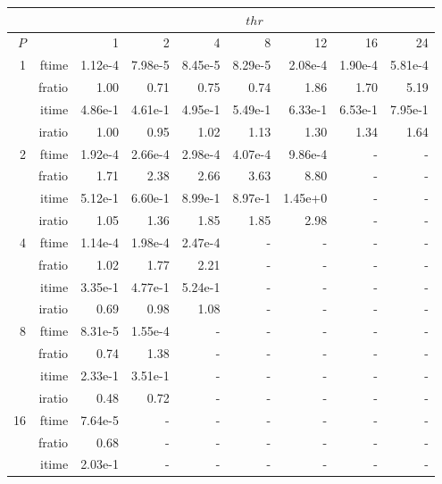 \documentclass[a4paper]{article}
\begin{document}
\begin{table}[htbp]
\begin{center}
\begin{small}
\begin{tabular}{|r|r|r|r|r|r|r|r|r|}
\hline 
     &  & \multicolumn{7}{c|}{$thr$} \\ \hline
    $P$  &  & 1           & 2    & 4    & 8    & 12   & 16    & 24  \\ \hline\hline
   1 &  ftime &   1.12e-4 &   7.98e-5 &   8.45e-5 &   8.29e-5 &   2.08e-4 &   1.90e-4 &   5.81e-4 \\
     &  fratio &   1.00 &   0.71 &   0.75 &   0.74 &   1.86 &   1.70 &   5.19 \\
     &  itime &   4.86e-1 &   4.61e-1 &   4.95e-1 &   5.49e-1 &   6.33e-1 &   6.53e-1 &   7.95e-1 \\
     &  iratio &   1.00 &   0.95 &   1.02 &   1.13 &   1.30 &   1.34 &   1.64 \\ \hline
   2 &  ftime &   1.92e-4 &   2.66e-4 &   2.98e-4 &   4.07e-4 &   9.86e-4 &  - &  - \\
     &  fratio &   1.71 &   2.38 &   2.66 &   3.63 &   8.80 &  - &  - \\
     &  itime &   5.12e-1 &   6.60e-1 &   8.99e-1 &   8.97e-1 &   1.45e+0 &  - &  - \\
     &  iratio &   1.05 &   1.36 &   1.85 &   1.85 &   2.98 &  - &  - \\\hline
   4 &  ftime &   1.14e-4 &   1.98e-4 &   2.47e-4 &  - &  - &  - &  - \\
     &  fratio &   1.02 &   1.77 &   2.21 &  - &  - &  - &  - \\
     &  itime &   3.35e-1 &   4.77e-1 &   5.24e-1 &  - &  - &  - &  - \\
     &  iratio &   0.69 &   0.98 &   1.08 &  - &  - &  - &  - \\ \hline
   8 &  ftime &   8.31e-5 &   1.55e-4 &  - &  - &  - &  - &  - \\
     &  fratio &   0.74 &   1.38 &  - &  - &  - &  - &  - \\
     &  itime &   2.33e-1 &   3.51e-1 &  - &  - &  - &  - &  - \\
     &  iratio &   0.48 &   0.72 &  - &  - &  - &  - &  - \\ \hline
  16 &  ftime &   7.64e-5 &  - &  - &  - &  - &  - &  - \\
     &  fratio &   0.68 &  - &  - &  - &  - &  - &  - \\
     &  itime &   2.03e-1 &  - &  - &  - &  - &  - &  - \\

\end{tabular}
\end{small}
\end{center}
\end{table}
\end{document}
